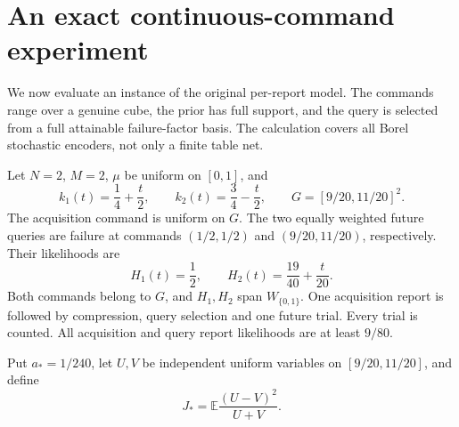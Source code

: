 \section{An exact continuous-command experiment}
\label{sec:v33-instance}

We now evaluate an instance of the original per-report model. The
commands range over a genuine cube, the prior has full support, and
the query is selected from a full attainable failure-factor basis.
The calculation covers all Borel stochastic encoders, not only a
finite table net.

Let $N=2$, $M=2$, $\mu$ be uniform on $[0,1]$, and
\begin{equation}\label{eq:v33-example-cells}
 k_1(t)=\frac14+\frac t2,\qquad
 k_2(t)=\frac34-\frac t2,\qquad
 G=[9/20,11/20]^2.
\end{equation}
The acquisition command is uniform on $G$. The two equally weighted
future queries are failure at commands $(1/2,1/2)$ and
$(9/20,11/20)$, respectively. Their likelihoods are
\begin{equation}\label{eq:v33-example-queries}
 H_1(t)=\frac12,\qquad H_2(t)=\frac{19}{40}+\frac t{20}.
\end{equation}
Both commands belong to $G$, and $H_1,H_2$ span $W_{\{0,1\}}$.
One acquisition report is followed by compression, query selection
and one future trial. Every trial is counted. All acquisition and
query report likelihoods are at least $9/80$.

Put $a_*=1/240$, let $U,V$ be independent uniform variables on
$[9/20,11/20]$, and define
\[
 J_* =\mathbb E\frac{(U-V)^2}{U+V}.
\]

